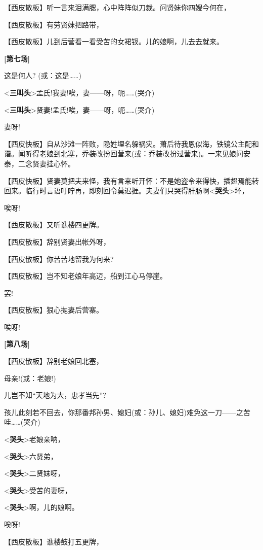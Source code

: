 【西皮散板】听一言来泪满腮，心中阵阵似刀裁。问贤妹你四嫂今何在，

【西皮散板】有劳贤妹把路带，

【西皮散板】儿到后营看一看受苦的女裙钗。儿的娘啊，儿去去就来。

\textbf{{[}第七场{]}}

这是何人? (或：这是\ldots{}\ldots{})

\textless{}\textbf{三叫头}\textgreater{}孟氏!我妻!唉，妻------呀，呃\ldots{}\ldots{}(哭介)

\textless{}\textbf{三叫头}\textgreater{}贤妻!孟氏!唉，妻------呀，呃\ldots{}\ldots{}(哭介)

妻呀!

【西皮快板】自从沙滩一阵败，隐姓埋名躲祸灾。萧后待我恩似海，铁镜公主配和谐。闻听得老娘到北塞，乔装改扮回营来(或：乔装改扮过营来)。一来见娘问安泰，二念贤妻挂心怀。

【西皮快板】贤妻莫把夫来怪，我有言来听开怀：不是她盗令来得快，插翅焉能转回来。临行时言语叮咛再，即刻回令莫迟捱。夫妻们只哭得肝肠啊\textless{}\textbf{哭头}\textgreater{}坏，

唉呀!

【西皮散板】又听谯楼四更牌。

【西皮散板】辞别贤妻出帐外呀，

【西皮散板】你苦苦地留我为何来?

【西皮散板】岂不知老娘年高迈，船到江心马停崖。

罢!

【西皮散板】狠心抛妻后营寨。

唉呀!

\textbf{{[}第八场{]}}

【西皮散板】辞别老娘回北塞，

母亲!(或：老娘!)

儿岂不知``天地为大，忠孝当先''?

孩儿此刻若不回去，你那番邦孙男、媳妇(或：孙儿、媳妇)难免这一刀------之苦哇\ldots{}\ldots{}(哭介)

\textless{}\textbf{哭头}\textgreater{}老娘亲呐，

\textless{}\textbf{哭头}\textgreater{}六贤弟，

\textless{}\textbf{哭头}\textgreater{}二贤妹呀，

\textless{}\textbf{哭头}\textgreater{}受苦的妻呀，

\textless{}\textbf{哭头}\textgreater{}啊，儿的娘啊。

唉呀!

【西皮散板】谯楼鼓打五更牌，

